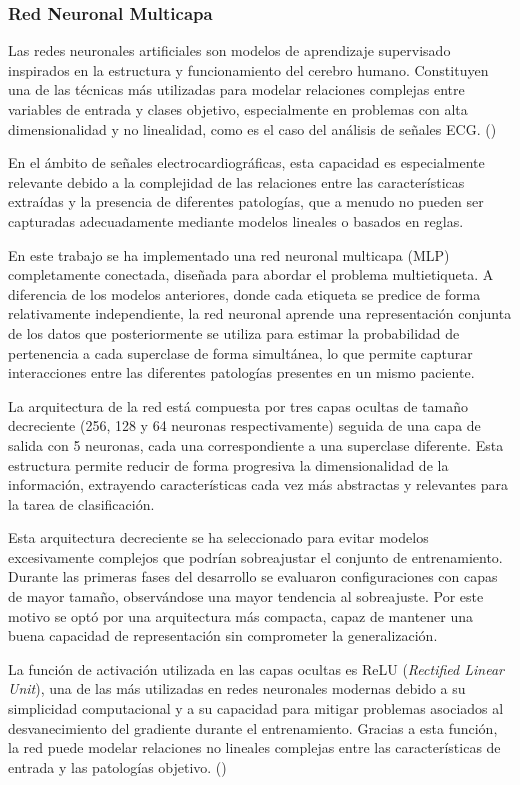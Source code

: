 \documentclass[12pt,a4paper,twoside]{book}
\begin{document}
\subsubsection*{Red Neuronal Multicapa}

Las redes neuronales artificiales son modelos de aprendizaje supervisado inspirados en la estructura y funcionamiento del cerebro humano.
Constituyen una de las técnicas más utilizadas para modelar relaciones complejas entre variables de entrada y clases objetivo, especialmente en problemas con alta dimensionalidad y no linealidad, como es el caso del análisis de señales ECG. (\cite{ibm_neural_networks})

En el ámbito de señales electrocardiográficas, esta capacidad es especialmente relevante debido a la complejidad de las relaciones entre las características extraídas y la presencia de diferentes patologías, que a menudo no pueden ser capturadas adecuadamente mediante modelos lineales o basados en reglas.

En este trabajo se ha implementado una red neuronal multicapa (MLP) completamente conectada, diseñada para abordar el problema multietiqueta.
A diferencia de los modelos anteriores, donde cada etiqueta se predice de forma relativamente independiente, la red neuronal aprende una representación conjunta de los datos que posteriormente se utiliza para estimar la probabilidad de pertenencia a cada superclase de forma simultánea, lo que permite capturar interacciones entre las diferentes patologías presentes en un mismo paciente.

La arquitectura de la red está compuesta por tres capas ocultas de tamaño decreciente (256, 128 y 64 neuronas respectivamente) seguida de una capa de salida con 5 neuronas, cada una correspondiente a una superclase diferente.
Esta estructura permite reducir de forma progresiva la dimensionalidad de la información, extrayendo características cada vez más abstractas y relevantes para la tarea de clasificación.

Esta arquitectura decreciente se ha seleccionado para evitar modelos excesivamente complejos que podrían sobreajustar el conjunto de entrenamiento.
Durante las primeras fases del desarrollo se evaluaron configuraciones con capas de mayor tamaño, observándose una mayor tendencia al sobreajuste. 
Por este motivo se optó por una arquitectura más compacta, capaz de mantener una buena capacidad de representación sin comprometer la generalización.

La función de activación utilizada en las capas ocultas es ReLU (\textit{Rectified Linear Unit}), una de las más utilizadas en redes neuronales modernas debido a su simplicidad computacional y a su capacidad para mitigar problemas asociados al desvanecimiento del gradiente durante el entrenamiento. 
Gracias a esta función, la red puede modelar relaciones no lineales complejas entre las características de entrada y las patologías objetivo. (\cite{codificandobits_activacion})
\end{document}
